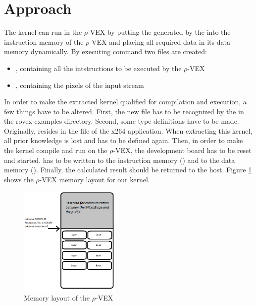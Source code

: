 \section{Approach}
\label{sec:approach}
The kernel can run in the $\rho$-VEX by putting the  generated by the  into the instruction memory of the $\rho$-VEX and placing all required data in its data memory dynamically. By executing  command two files are created:
\begin{itemize}
	\item {}, containing all the intstructions to be executed by the $\rho$-VEX
	\item {}, containing the pixels of the input stream
\end{itemize}

In order to make the extracted kernel qualified for compilation and execution, a few things have to be altered. First, the new file has to be recognized by the  in the rovex-examples directory. Second, some type definitions have to be made. Originally,  resides in the  file of the x264 application. When extracting this kernel, all prior knowledge is lost and has to be defined again. Then, in order to make the kernel compile and run on the $\rho$-VEX, the development board has to be reset and started.  has to be written to the instruction memory () and  to the data memory (). Finally, the calculated result should be returned to the host. Figure \ref{fig:rvex-dmem} shows the $\rho$-VEX memory layout for our kernel.
\begin{figure}[htb]%
\centering
\includegraphics[height=200px]{Pictures/dmem_rvex}%
\caption{Memory layout of the $\rho$-VEX}%
\label{fig:rvex-dmem}%
\end{figure}

